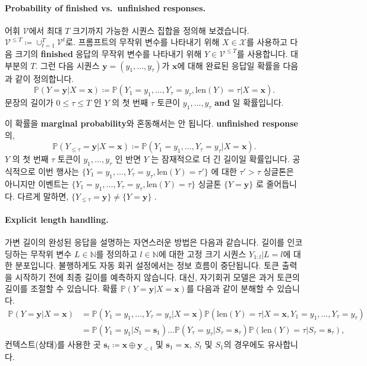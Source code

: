 \documentclass{article}
\def\s{{\bm{s}}}
\def\x{{\bm{x}}}
\def\y{{\bm{y}}}
\def\NN{{\mathbb{N}}}
\def\PP{{\mathbb{P}}}
\def\cV{{\mathcal{V}}}
\def\cX{{\mathcal{X}}}
\def\len{{\mathrm{len}}}
\begin{document}
\paragraph{Probability of finished vs.\ unfinished responses.}

어휘 $\cV$에서 최대 $T$ 크기까지 가능한 시퀀스 집합을 정의해 보겠습니다. 
$\cV^{\le T} \coloneqq \cup_{t=1}^T \cV^t$로. 
프롬프트의 무작위 변수를 나타내기 위해 $X \in \cX$를 사용하고 다음 크기의 \textbf{finished} 응답의 무작위 변수를 나타내기 위해 $Y \in \cV^{\le
T}$를 사용합니다.
대부분의 $T$.  그런 다음 시퀀스 $\y=(y_1, \ldots,
y_\tau)$가 $\x$에 대해 완료된 응답일 확률을 다음과 같이 정의합니다.
\[
 \PP (Y= \y |X= \x ) \coloneqq \PP (Y_1=y_1, \ldots , Y_ \tau =y_ \tau , \len (Y)= \tau |X= \x).
\]
문장의 길이가 $0 \le \tau \le T$ 인 $Y$ 의 첫 번째 $\tau$ 토큰이 $y_1, \ldots,
y_\tau$ \textbf{and} 일 확률입니다.

이 확률을 \textbf{marginal probability}와 혼동해서는 안 됩니다. 
\textbf{unfinished response}의,
\[
 \PP (Y_{ \le \tau }= \y |X= \x ) \coloneqq \PP (Y_1=y_1, \ldots , Y_ \tau =y_ \tau |X= \x).
\]
$Y$ 의 첫 번째 $\tau$ 토큰이 $y_1, \ldots,
y_\tau$ 인 반면 $Y$ 는 잠재적으로 더 긴 길이일 확률입니다.  공식적으로 이번 행사는 
 $\{Y_1=y_1, \ldots, Y_\tau=y_\tau, \len(Y)=\tau'\}$  
에 대한 
 $\tau' > \tau$ 
싱글톤은 아니지만 이벤트는 
 $\{Y_1=y_1, \ldots, Y_\tau=y_\tau, \len(Y)=\tau\}$  
싱글톤 $\{Y=\y\}$ 로 줄어듭니다. 
다르게 말하면, 
 $\{Y_{\le \tau} = \y\} \neq \{Y=\y\}$ .

\paragraph{Explicit length handling.}

가변 길이의 완성된 응답을 설명하는 자연스러운 방법은 다음과 같습니다.
길이를 인코딩하는 무작위 변수 $L \in \NN$를 정의하고
$l \in \NN$에 대한 고정 크기 시퀀스 $Y_{1:l}|L=l$에 대한 분포입니다.
불행하게도 자동 회귀 설정에서는 정보 흐름이 중단됩니다.
토큰 출력을 시작하기 전에 최종 길이를 예측하지 않습니다. 대신,
자기회귀 모델은 과거 토큰의 길이를 조절할 수 있습니다.
확률 $\PP(Y=\y |X=\x)$를 다음과 같이 분해할 수 있습니다.
 \begin{align*} 
 \PP (Y= \y |X= \x ) & = \PP (Y_1 = y_1, \ldots , Y_ \tau =y_ \tau | X= \x )
 \PP ( \len (Y)= \tau | X= \x , Y_1 = y_1, \ldots , Y_ \tau =y_ \tau ) \\
& = \PP (Y_1 = y_1 |S_1 = \s _1) \ldots \PP (Y_ \tau =y_ \tau | S_ \tau = \s _ \tau )
 \PP ( \len (Y)= \tau | S_ \tau = \s _ \tau ),
 \end{align*} 
컨텍스트(상태)를 사용한 곳
 $\s_t \coloneqq \x \oplus \y_{<t}$ 및 $\s_1 = \x$,
$S_t$ 및 $S_1$의 경우에도 유사합니다.
\end{document}
